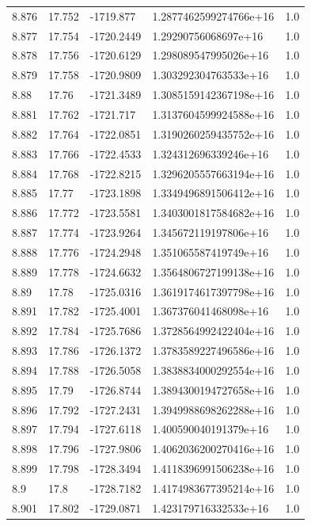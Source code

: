 \begin{tabular}{lllll}
8.876 & 17.752 & -1719.877 & 1.2877462599274766e+16 & 1.0 \\
8.877 & 17.754 & -1720.2449 & 1.29290756068697e+16 & 1.0 \\
8.878 & 17.756 & -1720.6129 & 1.298089547995026e+16 & 1.0 \\
8.879 & 17.758 & -1720.9809 & 1.303292304763533e+16 & 1.0 \\
8.88 & 17.76 & -1721.3489 & 1.3085159142367198e+16 & 1.0 \\
8.881 & 17.762 & -1721.717 & 1.3137604599924588e+16 & 1.0 \\
8.882 & 17.764 & -1722.0851 & 1.3190260259435752e+16 & 1.0 \\
8.883 & 17.766 & -1722.4533 & 1.324312696339246e+16 & 1.0 \\
8.884 & 17.768 & -1722.8215 & 1.3296205557663194e+16 & 1.0 \\
8.885 & 17.77 & -1723.1898 & 1.3349496891506412e+16 & 1.0 \\
8.886 & 17.772 & -1723.5581 & 1.3403001817584682e+16 & 1.0 \\
8.887 & 17.774 & -1723.9264 & 1.345672119197806e+16 & 1.0 \\
8.888 & 17.776 & -1724.2948 & 1.351065587419749e+16 & 1.0 \\
8.889 & 17.778 & -1724.6632 & 1.3564806727199138e+16 & 1.0 \\
8.89 & 17.78 & -1725.0316 & 1.3619174617397798e+16 & 1.0 \\
8.891 & 17.782 & -1725.4001 & 1.367376041468098e+16 & 1.0 \\
8.892 & 17.784 & -1725.7686 & 1.3728564992422404e+16 & 1.0 \\
8.893 & 17.786 & -1726.1372 & 1.3783589227496586e+16 & 1.0 \\
8.894 & 17.788 & -1726.5058 & 1.3838834000292554e+16 & 1.0 \\
8.895 & 17.79 & -1726.8744 & 1.3894300194727658e+16 & 1.0 \\
8.896 & 17.792 & -1727.2431 & 1.3949988698262288e+16 & 1.0 \\
8.897 & 17.794 & -1727.6118 & 1.400590040191379e+16 & 1.0 \\
8.898 & 17.796 & -1727.9806 & 1.4062036200270416e+16 & 1.0 \\
8.899 & 17.798 & -1728.3494 & 1.4118396991506238e+16 & 1.0 \\
8.9 & 17.8 & -1728.7182 & 1.4174983677395214e+16 & 1.0 \\
8.901 & 17.802 & -1729.0871 & 1.423179716332533e+16 & 1.0 \\

\end{tabular}
